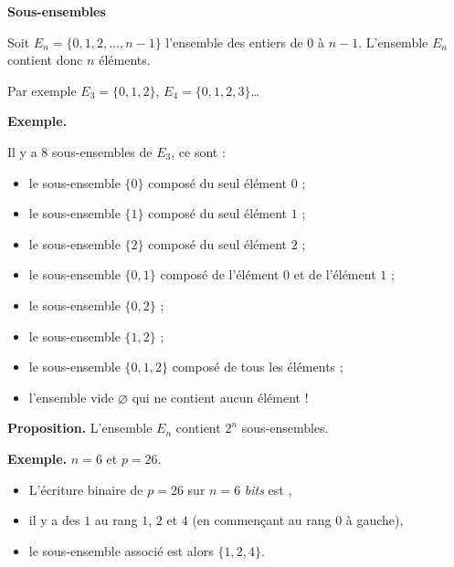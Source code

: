 \documentclass[12pt,class=report,crop=false]{standalone}
\begin{document}
%  
%


  
\newpage

\textbf{Sous-ensembles}

Soit $E_n = \{0,1,2,\ldots,n-1\}$ l'ensemble des entiers de $0$ à $n-1$. L'ensemble $E_n$ contient donc $n$ éléments.

Par exemple $E_3 = \{ 0,1,2 \}$, $E_4 = \{ 0,1,2,3 \}$\ldots

\bigskip

\textbf{Exemple.}

Il y a $8$ sous-ensembles de $E_3$, ce sont :
    \begin{itemize}
      \item le sous-ensemble $\{0\}$ composé du seul élément $0$ ;
      \item le sous-ensemble $\{1\}$ composé du seul élément $1$ ;      
      \item le sous-ensemble $\{2\}$ composé du seul élément $2$ ; 
      \item le sous-ensemble $\{0,1\}$ composé de l'élément $0$ et de l'élément $1$ ;           
      \item le sous-ensemble $\{0,2\}$ ;
      \item le sous-ensemble $\{1,2\}$ ; 
      \item le sous-ensemble $\{0, 1,2\}$ composé de tous les éléments ;
      \item l'ensemble vide $\varnothing$ qui ne contient aucun élément !    
    \end{itemize} 

\medskip

\textbf{Proposition.} L'ensemble $E_n$ contient $2^n$ sous-ensembles.

\newpage

\textbf{Exemple.} $n = 6$ et $p=26$.
\begin{itemize}
  \item L'écriture binaire de $p=26$ sur $n=6$ \emph{bits} est 
  \ci[0,1,1,0,1,0],
  \item il y a des $1$ au rang $1$, $2$ et $4$ (en commençant au rang $0$ à gauche),
  \item le sous-ensemble associé est alors $\{1,2,4\}$.
\end{itemize}
\end{document}

